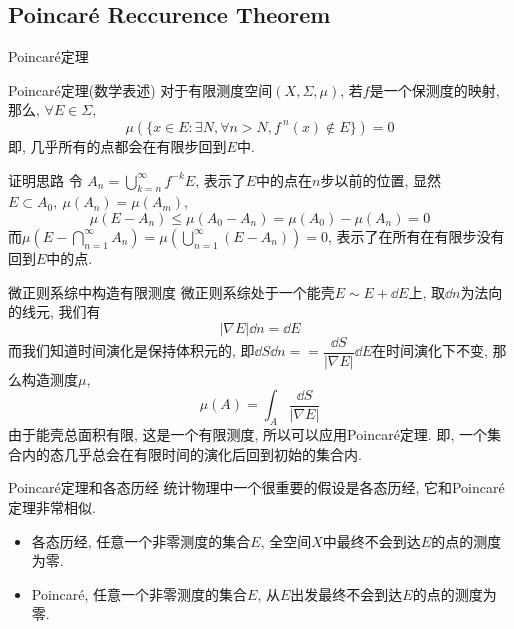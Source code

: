 \documentclass[aspectratio=169]{wzbeamer}
\begin{document}
    \subsection{Poincar\'e Reccurence Theorem}
    \begin{frame}{Poincar\'e定理}
        \begin{alertblock}{Poincar\'e定理(数学表述)}
            对于有限测度空间$(X,\Sigma,\mu)$, 若$f$是一个保测度的映射, 那么, $\forall E\in\Sigma$, 
            \begin{equation}
                \mu(\{x\in E: \exists N, \forall n > N, f^{\ n}(x) \notin E \}) = 0
            \end{equation} 
            即, 几乎所有的点都会在有限步回到$E$中.
        \end{alertblock}
    \end{frame}
    \begin{frame}{证明思路}
        令 $A_n = \bigcup_{k=n}^{\infty} f^{-k}E$, 表示了$E$中的点在$n$步以前的位置, 显然$E\subset A_0,\ \mu(A_n) = \mu(A_m)$, 
        \begin{equation}
            \mu(E - A_n) \leqslant \mu(A_0 - A_n) = \mu(A_0) - \mu(A_n) = 0
        \end{equation}
        而$\mu(E - \bigcap_{n=1}^\infty A_n) = \mu(\bigcup_{n=1}^\infty (E - A_n)) = 0 $, 表示了在所有在有限步没有回到$E$中的点.
    \end{frame}
    \begin{frame}{微正则系综中构造有限测度}
        微正则系综处于一个能壳$E\sim E+\dd E$上, 取$\dd n$为法向的线元, 我们有
        \begin{equation}
            |\nabla E|\dd n = \dd E  
        \end{equation}
        而我们知道时间演化是保持体积元的, 即$\dd S\dd n == \dfrac{\dd S}{|\nabla E|} \dd E$在时间演化下不变, 那么构造测度$\mu$,
        \begin{equation}
            \mu(A) = \int_A \frac{\dd S}{|\nabla E|}
        \end{equation}
        由于能壳总面积有限, 这是一个有限测度, 所以可以应用Poincar\'e定理. 即, 一个集合内的态几乎总会在有限时间的演化后回到初始的集合内.
    \end{frame}
    \begin{frame}{Poincar\'e定理和各态历经}
        统计物理中一个很重要的假设是各态历经, 它和Poincar\'e定理非常相似.
        \begin{itemize}
            \item 各态历经, 任意一个非零测度的集合$E$, 全空间$X$中最终不会到达$E$的点的测度为零.
            \item Poincar\'e, 任意一个非零测度的集合$E$, 从$E$出发最终不会到达$E$的点的测度为零.
        \end{itemize}
    \end{frame}
    
    
\end{document}
